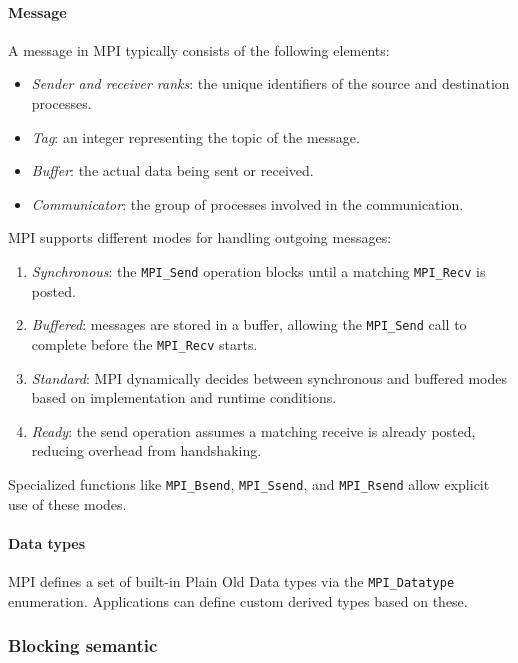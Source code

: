 \paragraph*{Message}
A message in MPI typically consists of the following elements:
\begin{itemize}
    \item \textit{Sender and receiver ranks}: the unique identifiers of the source and destination processes.
    \item \textit{Tag}: an integer representing the topic of the message. 
    \item \textit{Buffer}: the actual data being sent or received.
    \item \textit{Communicator}: the group of processes involved in the communication.
\end{itemize}
\noindent MPI supports different modes for handling outgoing messages:
\begin{enumerate}
    \item \textit{Synchronous}: the \texttt{MPI\_Send} operation blocks until a matching \texttt{MPI\_Recv} is posted.
    \item \textit{Buffered}: messages are stored in a buffer, allowing the \texttt{MPI\_Send} call to complete before the \texttt{MPI\_Recv} starts.
    \item \textit{Standard}: MPI dynamically decides between synchronous and buffered modes based on implementation and runtime conditions.
    \item \textit{Ready}: the send operation assumes a matching receive is already posted, reducing overhead from handshaking.
\end{enumerate}
Specialized functions like \texttt{MPI\_Bsend}, \texttt{MPI\_Ssend}, and \texttt{MPI\_Rsend} allow explicit use of these modes.

\paragraph*{Data types}
MPI defines a set of built-in Plain Old Data types via the \texttt{MPI\_Datatype} enumeration. 
Applications can define custom derived types based on these.

\subsubsection{Blocking semantic}
